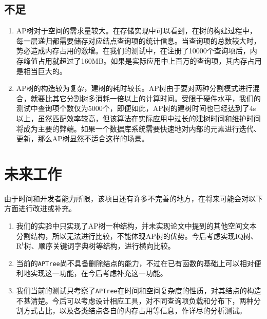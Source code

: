 \documentclass[UTF8]{ctexart}
\begin{document}
\subsection{不足}
\begin{enumerate}
    \item AP树对于空间的需求量较大。在存储实现中可以看到，在树的构建过程中，每一层递归都需要储存对应结点查询项的统计信息。当查询项的总数较大时，势必造成内存占用的激增。在我们的测试中，在注册了10000个查询项后，内存峰值占用就超过了160MB。如果是实际应用中上百万的查询项，其内存占用是相当巨大的。
    \item AP树的构造较为复杂，建树的耗时较长。AP树由于要对两种分割模式进行混合，就要比其它分割树多消耗一倍以上的计算时间。受限于硬件水平，我们的测试中查询项个数仅为5000个，即便如此，AP树的建树时间也已经达到了4s以上，虽然匹配效率较高，但该算法在实际应用中过长的建树时间和维护时间将成为主要的弊端。如果一个数据库系统需要快速地对内部的元素进行迭代、更新，那么AP树显然不适合这样的场景。
\end{enumerate}

\section{未来工作}
由于时间和开发者能力所限，该项目还有许多不完善的地方，在将来可能会对以下方面进行改进或补充。
\begin{enumerate}
    \item 我们的实验中只实现了AP树一种结构，并未实现论文中提到的其他空间文本分割结构，所以无法进行比较，不能体现AP树的优势。今后考虑实现IQ树、$\mathrm{R^t}$树、顺序关键词字典树等结构，进行横向比较。
    \item 当前的\texttt{APTree}尚不具备删除结点的能力，不过在已有函数的基础上可以相对便利地实现这一功能，在今后考虑补充这一功能。
    \item 我们当前的测试只考察了\texttt{APTree}在时间和空间复杂度的性质，对其结点的构造不甚清楚。今后可以考虑设计相应工具，对不同查询项负载和分布下，两种分割方式占比，以及各类结点各自的内存占用等信息，作详尽的分析测试。
\end{enumerate}

\newpage
\end{document}
